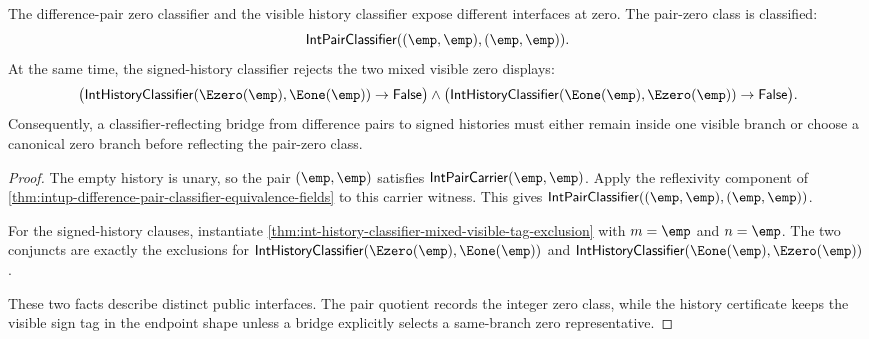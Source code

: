 \begin{theorem}
\label{thm:int-zero-sign-refined-boundary}
The difference-pair zero classifier and the visible history classifier expose
different interfaces at zero. The pair-zero class is classified:
$$
\mathsf{IntPairClassifier}((\emp,\emp),(\emp,\emp)).
$$
At the same time, the signed-history classifier rejects the two mixed visible
zero displays:
$$
\bigl(\mathsf{IntHistoryClassifier}(\Ezero(\emp),\Eone(\emp))\to\mathsf{False}\bigr)
\land
\bigl(\mathsf{IntHistoryClassifier}(\Eone(\emp),\Ezero(\emp))\to\mathsf{False}\bigr).
$$
Consequently, a classifier-reflecting bridge from difference pairs to signed
histories must either remain inside one visible branch or choose a canonical
zero branch before reflecting the pair-zero class.
\end{theorem}
\begin{proof}
The empty history is unary, so the pair $(\emp,\emp)$ satisfies
$\mathsf{IntPairCarrier}(\emp,\emp)$. Apply the reflexivity component of
\autoref{thm:intup-difference-pair-classifier-equivalence-fields} to this
carrier witness. This gives
$\mathsf{IntPairClassifier}((\emp,\emp),(\emp,\emp))$.

For the signed-history clauses, instantiate
\autoref{thm:int-history-classifier-mixed-visible-tag-exclusion} with
$m=\emp$ and $n=\emp$. The two conjuncts are exactly the exclusions for
$\mathsf{IntHistoryClassifier}(\Ezero(\emp),\Eone(\emp))$ and
$\mathsf{IntHistoryClassifier}(\Eone(\emp),\Ezero(\emp))$.

These two facts describe distinct public interfaces. The pair quotient records
the integer zero class, while the history certificate keeps the visible sign
tag in the endpoint shape unless a bridge explicitly selects a same-branch
zero representative.
\end{proof}

